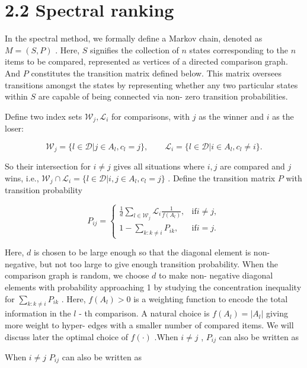 \section{2.2 Spectral ranking}\label{spectral-ranking}

In the spectral method, we formally define a Markov chain, denoted as
\(M = (S,P)\) . Here, \(S\) signifies the collection of \(n\) states
corresponding to the \(n\) items to be compared, represented as vertices
of a directed comparison graph. And \(P\) constitutes the transition
matrix defined below. This matrix oversees transitions amongst the
states by representing whether any two particular states within \(S\)
are capable of being connected via non- zero transition probabilities.

Define two index sets \(\mathcal{W}_{j},\mathcal{L}_{i}\) for
comparisons, with \(j\) as the winner and \(i\) as the loser:

\[
\mathcal{W}_{j} = \{l\in \mathcal{D}|j\in A_{l},c_{l} = j\} ,\qquad \mathcal{L}_{i} = \{l\in \mathcal{D}|i\in A_{l},c_{l}\neq i\} .
\]

So their intersection for \(i\neq j\) gives all situations where \(i,j\)
are compared and \(j\) wins, i.e.,
\(\mathcal{W}_{j}\cap \mathcal{L}_{i} = \{l\in \mathcal{D}|i,j\in A_{l},c_{l} = j\}\)
. Define the transition matrix \(P\) with transition probability

\[
P_{ij} = \left\{ \begin{array}{ll}\frac{1}{d}\sum_{l\in \mathcal{W}_{j}}\mathcal{L}_{i}\frac{1}{f(A_{l})}, & \text{if} i\neq j, \\ 1 - \sum_{k:k\neq i}P_{ik}, & \text{if} i = j. \end{array} \right.
\]

Here, \(d\) is chosen to be large enough so that the diagonal element is
non- negative, but not too large to give enough transition probability.
When the comparison graph is random, we choose \(d\) to make non-
negative diagonal elements with probability approaching 1 by studying
the concentration inequality for \(\sum_{k:k\neq i}P_{i k}\) . Here,
\(f(A_{l}) > 0\) is a weighting function to encode the total information
in the \(l\) - th comparison. A natural choice is \(f(A_{l}) = |A_{l}|\)
giving more weight to hyper- edges with a smaller number of compared
items. We will discuss later the optimal choice of \(f(\cdot)\) .When
\(i\neq j\) , \(P_{i j}\) can also be written as

When \(i\neq j\) \(P_{i j}\) can also be written as

